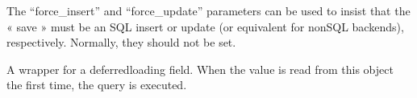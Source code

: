 \documentclass[letterpaper,10pt,french]{sphinxmanual}
\begin{document}
\begin{fulllineitems}
\begin{fulllineitems}
\sphinxAtStartPar
The “force\_insert” and “force\_update” parameters can be used to insist
that the « save » must be an SQL insert or update (or equivalent for
non\sphinxhyphen{}SQL backends), respectively. Normally, they should not be set.

\end{fulllineitems}


\begin{fulllineitems}
\label{\detokenize{main/model:main.models.Salaire.tcs}}
\pysigstartsignatures
{}
\pysigstopsignatures
\sphinxAtStartPar
A wrapper for a deferred\sphinxhyphen{}loading field. When the value is read from this
object the first time, the query is executed.

\end{fulllineitems}


\end{fulllineitems}

\end{document}
